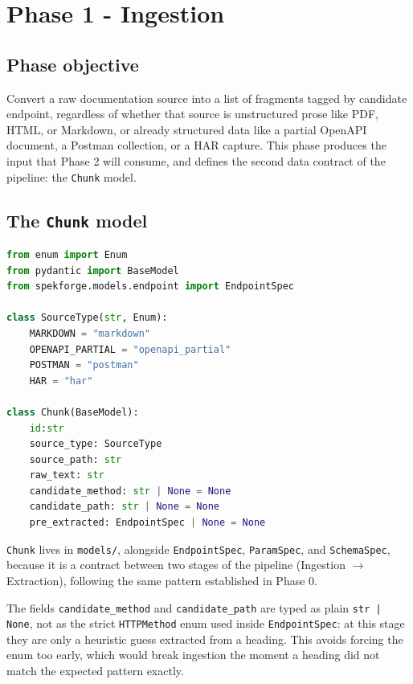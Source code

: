 \chapter{Phase 1 - Ingestion}

\section{Phase objective}

Convert a raw documentation source into a list of fragments tagged by
candidate endpoint, regardless of whether that source is unstructured prose
like PDF, HTML, or Markdown, or already structured data like a partial
OpenAPI document, a Postman collection, or a HAR capture. This phase
produces the input that Phase 2 will consume, and defines the second data
contract of the pipeline: the \texttt{Chunk} model.

\section{The \texttt{Chunk} model}

\begin{lstlisting}[language=Python, caption={\texttt{src/spekforge/models/chunk.py}}]
from enum import Enum
from pydantic import BaseModel
from spekforge.models.endpoint import EndpointSpec

class SourceType(str, Enum):
    MARKDOWN = "markdown"
    OPENAPI_PARTIAL = "openapi_partial"
    POSTMAN = "postman"
    HAR = "har"

class Chunk(BaseModel):
    id:str
    source_type: SourceType
    source_path: str
    raw_text: str
    candidate_method: str | None = None
    candidate_path: str | None = None
    pre_extracted: EndpointSpec | None = None
\end{lstlisting}

\texttt{Chunk} lives in \texttt{models/}, alongside \texttt{EndpointSpec},
\texttt{ParamSpec}, and \texttt{SchemaSpec}, because it is a contract
between two stages of the pipeline (Ingestion $\rightarrow$ Extraction),
following the same pattern established in Phase 0.

The fields \texttt{candidate\_method} and \texttt{candidate\_path} are typed
as plain \texttt{str | None}, not as the strict \texttt{HTTPMethod} enum
used inside \texttt{EndpointSpec}: at this stage they are only a heuristic
guess extracted from a heading. This avoids forcing the enum too early,
which would break ingestion the moment a heading did not match the
expected pattern exactly.

